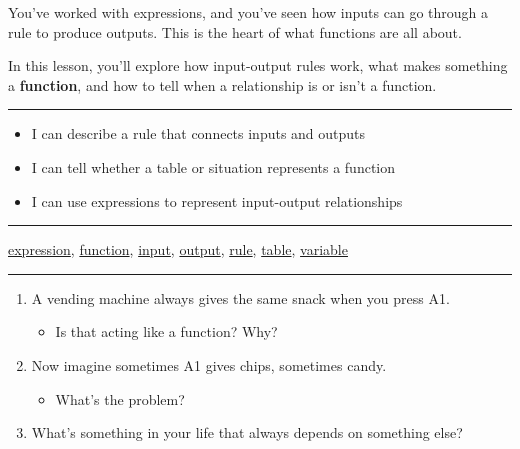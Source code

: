 \documentclass[
  letterpaper,
  DIV=11,
  numbers=noendperiod]{scrreprt}
\providecommand{\tightlist}{%
  \setlength{\itemsep}{0pt}\setlength{\parskip}{0pt}}
\begin{document}
You've worked with expressions, and you've seen how inputs can go
through a rule to produce outputs. This is the heart of what functions
are all about.

In this lesson, you'll explore how input-output rules work, what makes
something a \textbf{function}, and how to tell when a relationship is or
isn't a function.

\begin{center}\rule{0.5\linewidth}{0.5pt}\end{center}

\begin{itemize}
\tightlist
\item
  I can describe a rule that connects inputs and outputs\\
\item
  I can tell whether a table or situation represents a function\\
\item
  I can use expressions to represent input-output relationships\\
\end{itemize}

\begin{center}\rule{0.5\linewidth}{0.5pt}\end{center}

\href{./glossary.html\#glossary-expression}{expression},
\href{./glossary.html\#glossary-function}{function},
\href{./glossary.html\#glossary-input}{input},
\href{./glossary.html\#glossary-output}{output},
\href{./glossary.html\#glossary-rule}{rule},
\href{./glossary.html\#glossary-table}{table},
\href{./glossary.html\#glossary-variable}{variable}

\begin{center}\rule{0.5\linewidth}{0.5pt}\end{center}

\begin{enumerate}
\def\labelenumi{\arabic{enumi}.}
\tightlist
\item
  A vending machine always gives the same snack when you press A1.

  \begin{itemize}
  \tightlist
  \item
    Is that acting like a function? Why?
  \end{itemize}
\item
  Now imagine sometimes A1 gives chips, sometimes candy.

  \begin{itemize}
  \tightlist
  \item
    What's the problem?
  \end{itemize}
\item
  What's something in your life that always depends on something else?
\end{enumerate}
\end{document}

